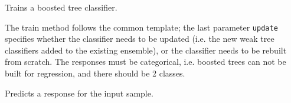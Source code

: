 Trains a boosted tree classifier.


The train method follows the common template; the last parameter \texttt{update} specifies whether the classifier needs to be updated (i.e. the new weak tree classifiers added to the existing ensemble), or the classifier needs to be rebuilt from scratch. The responses must be categorical, i.e. boosted trees can not be built for regression, and there should be 2 classes.


Predicts a response for the input sample.



